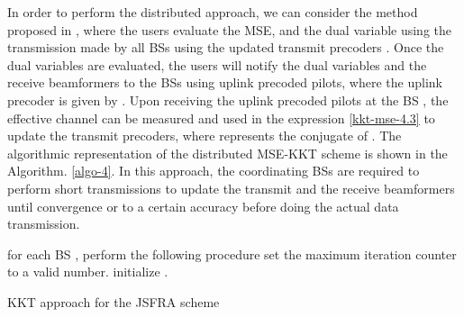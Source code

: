 In order to perform the distributed approach, we can consider the method proposed in \cite{komulainen2013effective}, where the users evaluate the \ac{MSE}, and the dual variable  using the transmission made by all \acp{BS} using the updated transmit precoders . Once the dual variables are evaluated, the users will notify the dual variables and the receive beamformers to the \acp{BS} using uplink precoded pilots, where the uplink precoder is given by . Upon receiving the uplink precoded pilots at the \ac{BS} , the effective channel  can be measured and used in the expression \eqref{kkt-mse-4.3} to update the transmit precoders, where  represents the conjugate of . The algorithmic representation of the distributed \ac{MSE}-\ac{KKT} scheme is shown in the Algorithm. \ref{algo-4}. In this approach, the coordinating \acp{BS} are required to perform short transmissions to update the transmit and the receive beamformers until convergence or to a certain accuracy before doing the actual data transmission.
\begin{algorithm}
 \SetAlgoLined
 \DontPrintSemicolon
 \BlankLine
 for each \ac{BS} , perform the following procedure \;
 set the maximum iteration counter  to a valid number. \;
 initialize . \;
 \caption{\ac{KKT} approach for the \ac{JSFRA} scheme}
 \label{algo-4}
\end{algorithm}

